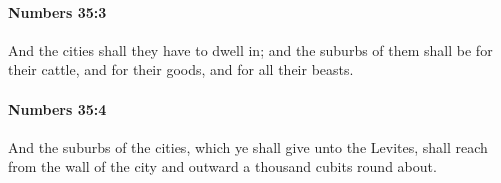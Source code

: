		\paragraph{Numbers 35:3} %
			\label{NUMBERS-35-3}

			And the cities shall they have to dwell in; and the suburbs of them shall be for their cattle, and for their goods, and for all their beasts.


		\paragraph{Numbers 35:4} %
			\label{NUMBERS-35-4}

			And the suburbs of the cities, which ye shall give unto the Levites, shall reach from the wall of the city and outward a thousand cubits round about.


